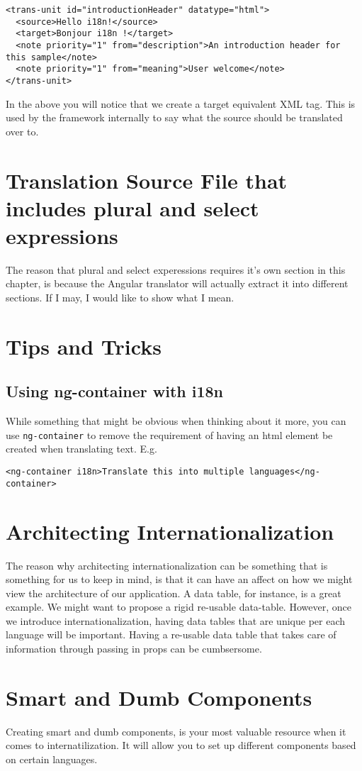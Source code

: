 \begin{lstlisting}[caption=src/locale/messages.fr.xlf(after translation)]
<trans-unit id="introductionHeader" datatype="html">
  <source>Hello i18n!</source>
  <target>Bonjour i18n !</target>
  <note priority="1" from="description">An introduction header for this sample</note>
  <note priority="1" from="meaning">User welcome</note>
</trans-unit>
\end{lstlisting}

In the above you will notice that we create a target equivalent XML tag. This
is used by the framework internally to say what the source should be translated 
over to. 

\section{Translation Source File that includes plural and select expressions}
The reason that plural and select experessions requires it's own section in 
this chapter, is because the Angular translator will actually extract it into 
different sections. If I may, I would like to show what I mean. 

\section{Tips and Tricks}

\subsection{Using ng-container with i18n}
While something that might be obvious when thinking about it more, you can use 
\lstinline{ng-container} to remove the requirement of having an html element 
be created when translating text. E.g. 
\begin{lstlisting}
<ng-container i18n>Translate this into multiple languages</ng-container>
\end{lstlisting}

\section{ Architecting Internationalization }
The reason why architecting internationalization can be something that is
something for us to keep in mind, is that it can have an affect on how we might
view the architecture of our application. A data table, for instance, is a great
example. We might want to propose a rigid re-usable data-table. However, once
we introduce internationalization, having data tables that are unique per each
language will be important. Having a re-usable data table that takes care of
information through passing in props can be cumbsersome.

\section{ Smart and Dumb Components }
Creating smart and dumb components, is your most valuable resource when it comes
to internatilization. It will allow you to set up different components based on
certain languages. 
